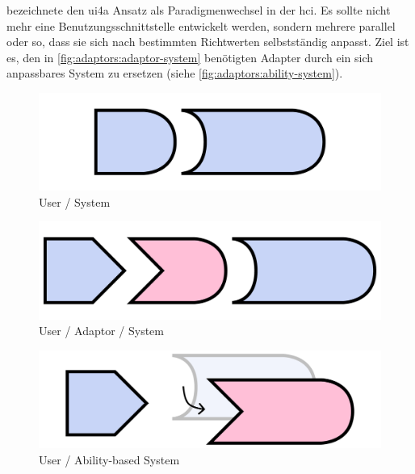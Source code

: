\documentclass[sigchi-a,screen,nonacm,language=german]{acmart}
\theoremstyle{acmdefinition}
\begin{document}
\citet{stephandis:ui-all:2001} bezeichnete den \ac{ui4a} Ansatz als Paradigmenwechsel in der \ac{hci}. Es sollte nicht mehr eine Benutzungsschnittstelle entwickelt werden, sondern mehrere parallel oder so, dass sie sich nach bestimmten Richtwerten selbstständig anpasst. Ziel ist es, den in \autoref{fig:adaptors:adaptor-system} benötigten Adapter durch ein sich anpassbares System zu ersetzen (siehe \autoref{fig:adaptors:ability-system}).

\begin{marginfigure}
    \centering

    \begin{subfigure}[b]{\marginparwidth}

        \includegraphics[width=\linewidth]{media/figures/ability-based_user-system.pdf}
        \caption{User / System}\label{fig:adaptors:user-system}
        
    \end{subfigure}
    \hfill
    \begin{subfigure}[b]{\marginparwidth}

        \includegraphics[width=\linewidth]{media/figures/ability-based_user-adaptor-system.pdf}
        \caption{User / Adaptor / System}\label{fig:adaptors:adaptor-system}
        
    \end{subfigure}
    \hfill
    \begin{subfigure}[b]{\marginparwidth}

        \includegraphics[width=\linewidth]{media/figures/ability-based_user-ability-system.pdf}
        \caption{User / Ability-based System}\label{fig:adaptors:ability-system}
        

\end{subfigure}
\end{marginfigure}
\end{document}
